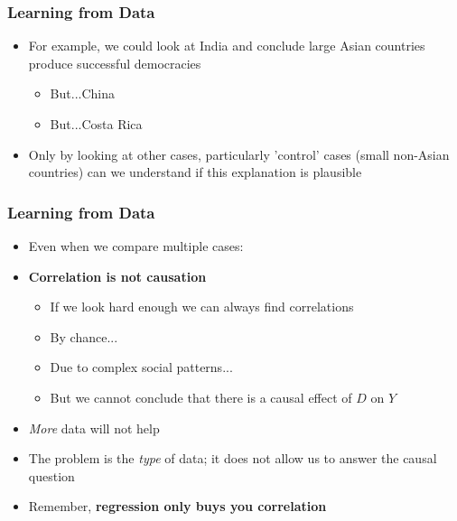 \documentclass[xcolor=x11names,compress]{beamer}\usepackage[]{graphicx}\usepackage[]{color}
\renewcommand{\(}{\begin{columns}}
\renewcommand{\)}{\end{columns}}
\newcommand{\<}[1]{\begin{column}{#1}}
\renewcommand{\>}{\end{column}}
\begin{document}
\begin{frame}
\frametitle{Learning from Data}
\begin{itemize}
\item For example, we could look at India and conclude large Asian countries produce successful democracies
\pause
\begin{itemize}
\item But...China
\pause
\item But...Costa Rica
\pause
\end{itemize}
\item Only by looking at other cases, particularly 'control' cases (small non-Asian countries) can we understand if this explanation is plausible
\end{itemize}
\end{frame}

\begin{frame}
\frametitle{Learning from Data}
\begin{itemize}
\item Even when we compare multiple cases:
\pause
\item \textbf{Correlation is not causation}
\pause
\begin{itemize}
\item If we look hard enough we can always find correlations
\pause
\item By chance...
\pause
\item Due to complex social patterns...
\pause
\item But we cannot conclude that there is a causal effect of $D$ on $Y$
\pause
\end{itemize}
\item \textit{More} data will not help
\pause
\item The problem is the \textit{type} of data; it does not allow us to answer the causal question 
\pause
\item Remember, \textbf{regression only buys you correlation}
\end{itemize}
\end{frame}







\end{document}
